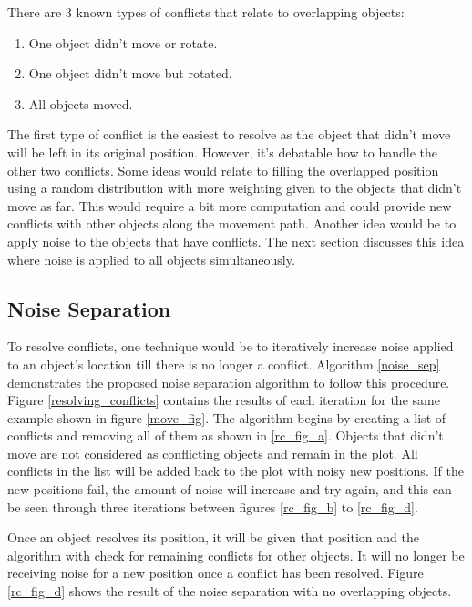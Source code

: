 \documentclass[conference]{IEEEtran}
\begin{document}
    There are 3 known types of conflicts that relate to overlapping objects:
    \begin{enumerate}
        \item One object didn't move or rotate.
        \item One object didn't move but rotated.
        \item All objects moved.
    \end{enumerate}
    The first type of conflict is the easiest to resolve as the object that didn’t move will be left in its original position. However, it’s debatable how to handle the other two conflicts. Some ideas would relate to filling the overlapped position using a random distribution with more weighting given to the objects that didn’t move as far. This would require a bit more computation and could provide new conflicts with other objects along the movement path. Another idea would be to apply noise to the objects that have conflicts. The next section discusses this idea where noise is applied to all objects simultaneously.
        
    \subsection{Noise Separation}
    To resolve conflicts, one technique would be to iteratively increase noise applied to an object’s location till there is no longer a conflict. Algorithm \ref{noise_sep} demonstrates the proposed noise separation algorithm to follow this procedure. Figure \ref{resolving_conflicts} contains the results of each iteration for the same example shown in figure \ref{move_fig}. The algorithm begins by creating a list of conflicts and removing all of them as shown in \ref{rc_fig_a}. Objects that didn’t move are not considered as conflicting objects and remain in the plot. All conflicts in the list will be added back to the plot with noisy new positions. If the new positions fail, the amount of noise will increase and try again, and this can be seen through three iterations between figures \ref{rc_fig_b} to \ref{rc_fig_d}. 

    Once an object resolves its position, it will be given that position and the algorithm with check for remaining conflicts for other objects. It will no longer be receiving noise for a new position once a conflict has been resolved. Figure \ref{rc_fig_d} shows the result of the noise separation with no overlapping objects.
\end{document}
